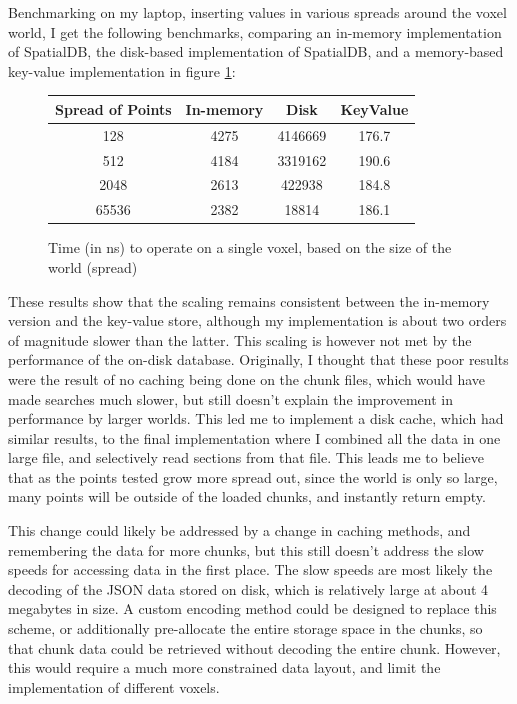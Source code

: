 \documentclass[10pt,twocolumn]{article}
\begin{document}
Benchmarking on my laptop, inserting values in various spreads around the voxel
world, I get the following benchmarks, comparing an in-memory implementation of
SpatialDB, the disk-based implementation of SpatialDB, and a memory-based
key-value implementation in figure \ref{fig:reads}:

\begin{figure}
  \centering
  \begin{tabular}{c | c | c | c}
    Spread of Points & In-memory & Disk & KeyValue\\
    \hline
    128 & 4275 & 4146669 & 176.7\\
    512 & 4184 & 3319162 & 190.6\\
    2048 & 2613 & 422938 & 184.8\\
    65536 & 2382 & 18814 & 186.1
  \end{tabular}
  \caption{Time (in ns) to operate on a single voxel, based on the size of the
  world (spread)}
  \label{fig:reads}
\end{figure}

These results show that the scaling remains consistent between the in-memory
version and the key-value store, although my implementation is about two orders
of magnitude slower than the latter. This scaling is however not met by the
performance of the on-disk database. Originally, I thought that these poor
results were the result of no caching being done on the chunk files, which would
have made searches much slower, but still doesn't explain the improvement in
performance by larger worlds. This led me to implement a disk cache, which had
similar results, to the final implementation where I combined all the data in
one large file, and selectively read sections from that file. This leads me to
believe that as the points tested grow more spread out, since the world is only
so large, many points will be outside of the loaded chunks, and instantly return
empty.

This change could likely be addressed by a change in caching methods, and
remembering the data for more chunks, but this still doesn't address the slow
speeds for accessing data in the first place. The slow speeds are most likely
the decoding of the JSON data stored on disk, which is relatively large at
about 4 megabytes in size. A custom encoding method could be designed to replace
this scheme, or additionally pre-allocate the entire storage space in the
chunks, so that chunk data could be retrieved without decoding the entire chunk.
However, this would require a much more constrained data layout, and limit the
implementation of different voxels.
\end{document}
